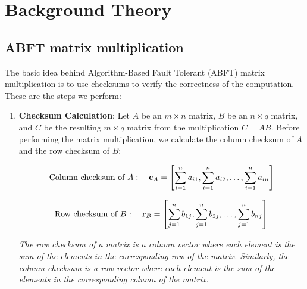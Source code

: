 \section{Background Theory}
\label{sec:background}

\subsection{ABFT matrix multiplication}

The basic idea behind Algorithm-Based Fault Tolerant (ABFT) matrix multiplication
is to use checksums to verify the correctness of the computation.
These are the steps we perform:

\begin{enumerate}
  \item \textbf{Checksum Calculation}:
    Let \( A \) be an \( m \times n \) matrix,
    \( B \) be an \( n \times q \) matrix,
    and \( C \) be the resulting \( m \times q \) matrix
    from the multiplication \( C = A B \).
    Before performing the matrix multiplication,
    we calculate the column checksum of \( A \) and the row checksum of \( B \):

    \[
      \textnormal{Column checksum of } A: \quad
      \mathbf{c}_A =
      \left[
        \sum_{i=1}^{n} a_{i1},
        \sum_{i=1}^{n} a_{i2},
        \ldots, \sum_{i=1}^{n} a_{in}
      \right]
    \]

    \[
      \textnormal{Row checksum of } B: \quad
      \mathbf{r}_B = \left[ \sum_{j=1}^{n} b_{1j}, \sum_{j=1}^{n} b_{2j}, \ldots, \sum_{j=1}^{n} b_{nj} \right]
    \]

    \textit{
      The row checksum of a matrix is a column vector where each element
      is the sum of the elements in the corresponding row of the matrix.
      Similarly, the column checksum is a row vector where
    each element is the sum of the elements in the corresponding column of the matrix.}


\end{enumerate}
